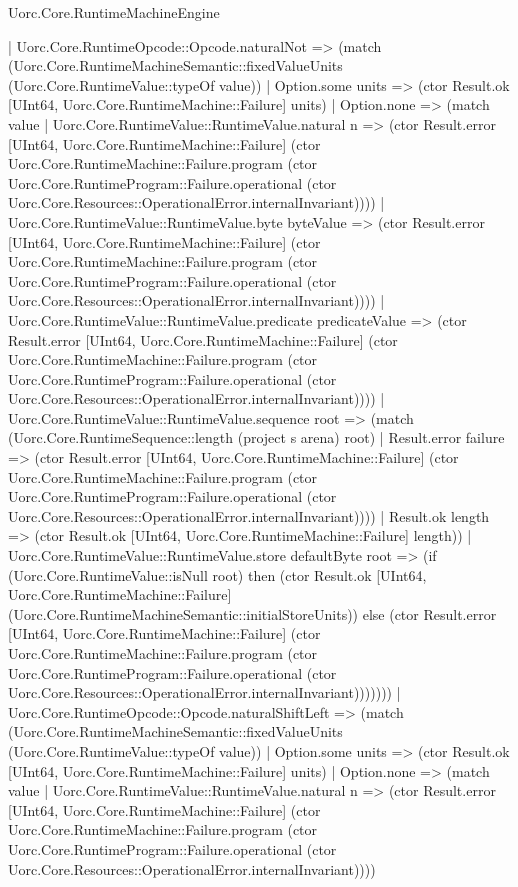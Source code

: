 \begin{lexlean}{Uorc.Core.RuntimeMachineEngine}
\begin{semanticmodule}
{          | Uorc.Core.RuntimeOpcode::Opcode.naturalNot => (match (Uorc.Core.RuntimeMachineSemantic::fixedValueUnits (Uorc.Core.RuntimeValue::typeOf value))
            | Option.some units => (ctor Result.ok [UInt64, Uorc.Core.RuntimeMachine::Failure] units)
            | Option.none => (match value
              | Uorc.Core.RuntimeValue::RuntimeValue.natural n => (ctor Result.error [UInt64, Uorc.Core.RuntimeMachine::Failure] (ctor Uorc.Core.RuntimeMachine::Failure.program (ctor Uorc.Core.RuntimeProgram::Failure.operational (ctor Uorc.Core.Resources::OperationalError.internalInvariant))))
              | Uorc.Core.RuntimeValue::RuntimeValue.byte byteValue => (ctor Result.error [UInt64, Uorc.Core.RuntimeMachine::Failure] (ctor Uorc.Core.RuntimeMachine::Failure.program (ctor Uorc.Core.RuntimeProgram::Failure.operational (ctor Uorc.Core.Resources::OperationalError.internalInvariant))))
              | Uorc.Core.RuntimeValue::RuntimeValue.predicate predicateValue => (ctor Result.error [UInt64, Uorc.Core.RuntimeMachine::Failure] (ctor Uorc.Core.RuntimeMachine::Failure.program (ctor Uorc.Core.RuntimeProgram::Failure.operational (ctor Uorc.Core.Resources::OperationalError.internalInvariant))))
              | Uorc.Core.RuntimeValue::RuntimeValue.sequence root => (match (Uorc.Core.RuntimeSequence::length (project s arena) root)
                | Result.error failure => (ctor Result.error [UInt64, Uorc.Core.RuntimeMachine::Failure] (ctor Uorc.Core.RuntimeMachine::Failure.program (ctor Uorc.Core.RuntimeProgram::Failure.operational (ctor Uorc.Core.Resources::OperationalError.internalInvariant))))
                | Result.ok length => (ctor Result.ok [UInt64, Uorc.Core.RuntimeMachine::Failure] length))
              | Uorc.Core.RuntimeValue::RuntimeValue.store defaultByte root => (if (Uorc.Core.RuntimeValue::isNull root) then (ctor Result.ok [UInt64, Uorc.Core.RuntimeMachine::Failure] (Uorc.Core.RuntimeMachineSemantic::initialStoreUnits)) else (ctor Result.error [UInt64, Uorc.Core.RuntimeMachine::Failure] (ctor Uorc.Core.RuntimeMachine::Failure.program (ctor Uorc.Core.RuntimeProgram::Failure.operational (ctor Uorc.Core.Resources::OperationalError.internalInvariant)))))))
          | Uorc.Core.RuntimeOpcode::Opcode.naturalShiftLeft => (match (Uorc.Core.RuntimeMachineSemantic::fixedValueUnits (Uorc.Core.RuntimeValue::typeOf value))
            | Option.some units => (ctor Result.ok [UInt64, Uorc.Core.RuntimeMachine::Failure] units)
            | Option.none => (match value
              | Uorc.Core.RuntimeValue::RuntimeValue.natural n => (ctor Result.error [UInt64, Uorc.Core.RuntimeMachine::Failure] (ctor Uorc.Core.RuntimeMachine::Failure.program (ctor Uorc.Core.RuntimeProgram::Failure.operational (ctor Uorc.Core.Resources::OperationalError.internalInvariant))))
}
\end{semanticmodule}
\end{lexlean}
